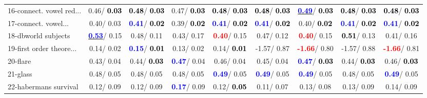 \begin{table}[h]
\begin{center}
\begin{tabular}{lc|c|c|c|c|c|c|c}
16-connect. vowel red... &   0.46/\textcolor{black}{\textbf{  0.03}} & \textcolor{black}{\textbf{  0.48}}/\textcolor{black}{\textbf{  0.03}} &   0.47/\textcolor{black}{\textbf{  0.03}} & \textcolor{black}{\textbf{  0.48}}/\textcolor{black}{\textbf{  0.03}} & \textcolor{black}{\textbf{  0.48}}/\textcolor{black}{\textbf{  0.03}} & \underline{\textcolor{blue}{\textbf{  0.49}}}/\textcolor{black}{\textbf{  0.03}} & \textcolor{black}{\textbf{  0.48}}/\textcolor{black}{\textbf{  0.03}} & \textcolor{black}{\textbf{  0.48}}/\textcolor{black}{\textbf{  0.03}} \\
17-connect. vowel... &   0.40/  0.03 & \textcolor{blue}{\textbf{  0.41}}/\textcolor{black}{\textbf{  0.02}} &   0.39/\textcolor{black}{\textbf{  0.02}} & \textcolor{blue}{\textbf{  0.41}}/\textcolor{black}{\textbf{  0.02}} & \textcolor{blue}{\textbf{  0.41}}/\textcolor{black}{\textbf{  0.02}} &   0.40/\textcolor{black}{\textbf{  0.02}} & \textcolor{blue}{\textbf{  0.41}}/\textcolor{black}{\textbf{  0.02}} & \textcolor{blue}{\textbf{  0.41}}/\textcolor{black}{\textbf{  0.02}} \\
18-dbworld subjects & \underline{\textcolor{blue}{\textbf{  0.53}}}/  0.15 &   0.48/  0.11 &   0.43/  0.17 & \textcolor{red}{\textbf{  0.40}}/  0.15 &   0.47/  0.12 & \textcolor{red}{\textbf{  0.40}}/  0.15 & \textcolor{black}{\textbf{  0.51}}/  0.13 &   0.41/  0.16 \\
19-first order theore... &   0.14/  0.02 & \textcolor{blue}{\textbf{  0.15}}/\textcolor{black}{\textbf{  0.01}} &   0.13/  0.02 &   0.14/\textcolor{black}{\textbf{  0.01}} &  -1.57/  0.87 & \textcolor{red}{\textbf{ -1.66}}/  0.80 &  -1.57/  0.88 & \textcolor{red}{\textbf{ -1.66}}/  0.81 \\
20-flare &   0.43/  0.04 &   0.44/\textcolor{black}{\textbf{  0.03}} & \textcolor{blue}{\textbf{  0.47}}/  0.04 &   0.46/  0.04 &   0.45/  0.04 & \textcolor{blue}{\textbf{  0.47}}/\textcolor{black}{\textbf{  0.03}} &   0.44/\textcolor{black}{\textbf{  0.03}} &   0.46/\textcolor{black}{\textbf{  0.03}} \\
21-glass &   0.48/  0.05 &   0.48/  0.05 &   0.48/  0.05 & \textcolor{blue}{\textbf{  0.49}}/  0.05 & \textcolor{blue}{\textbf{  0.49}}/  0.05 & \textcolor{blue}{\textbf{  0.49}}/  0.05 &   0.48/  0.05 & \textcolor{blue}{\textbf{  0.49}}/  0.05 \\ \hline
22-habermans survival &   0.12/  0.09 &   0.12/  0.09 & \textcolor{blue}{\textbf{  0.17}}/  0.09 &   0.12/\textcolor{black}{\textbf{  0.05}} &   0.11/  0.07 &   0.13/  0.08 &   0.13/  0.09 &   0.14/  0.09 \\

\end{tabular}
\end{center}
\end{table}
